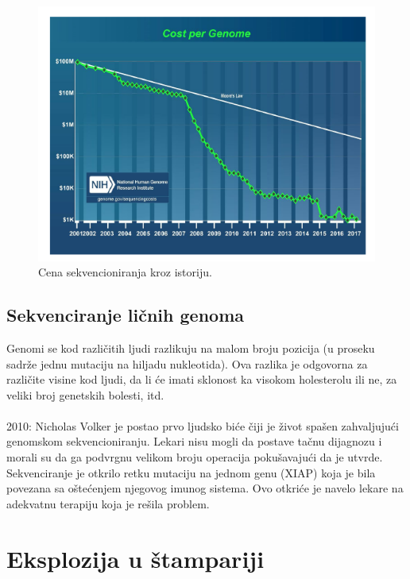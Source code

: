 \begin{figure}[H]
	\centering
	\includegraphics[width=1\textwidth]{poglavlja/3/slike/cena_sekvencioniranja.png}
	\caption{Cena sekvencioniranja kroz istoriju.}
	\label{slika:cena}
\end{figure} 



\subsection{Sekvenciranje ličnih genoma}

Genomi se kod različitih ljudi razlikuju na malom broju pozicija (u proseku sadrže jednu mutaciju na hiljadu nukleotida). Ova razlika je odgovorna za različite visine kod ljudi, da li će imati sklonost ka visokom holesterolu ili ne, za veliki broj genetskih bolesti, itd.
\\
\\
2010: Nicholas Volker je postao prvo ljudsko biće čiji je život spašen zahvaljujući genomskom sekvencioniranju.
Lekari nisu mogli da postave tačnu dijagnozu i morali su da ga podvrgnu velikom broju operacija pokušavajući da je utvrde. Sekvenciranje je otkrilo retku mutaciju na jednom genu (XIAP) koja je bila povezana sa oštećenjem njegovog imunog sistema. Ovo otkriće je navelo lekare na adekvatnu terapiju koja je rešila problem.

\section{Eksplozija u štampariji}


